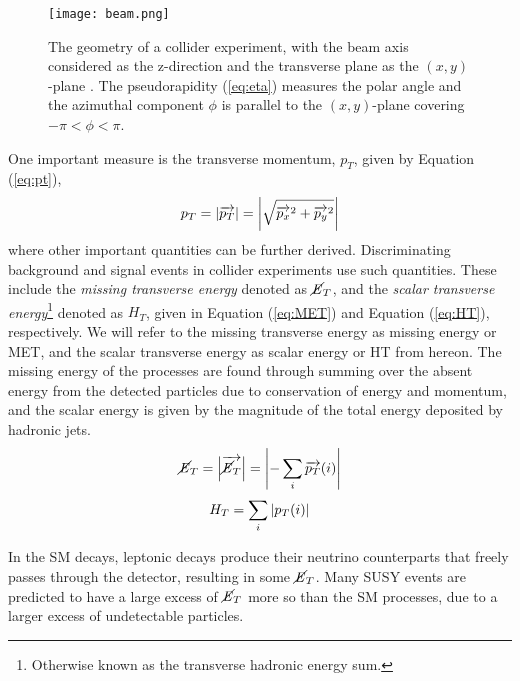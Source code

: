 \begin{figure}[htbp]
    \centering
    \texttt{[image: beam.png]}
    \caption{The geometry of a collider experiment, with the beam axis considered as the z-direction and the transverse plane as the $(x,y)$-plane \cite{barr2011guide}. The pseudorapidity (\ref{eq:eta}) measures the polar angle and the azimuthal component $\phi$ is parallel to the $(x,y)$-plane covering $-\pi < \phi < \pi$. }
    \label{fig:beam}
\end{figure}

One important measure is the transverse momentum, $p_T$, given by Equation (\ref{eq:pt}), 
\begin{equation}
    p_T = \abs{\overrightarrow{p_T}} = \abs{\sqrt{\overrightarrow{p_x}^2 + \overrightarrow{p_y}^2}}
    \label{eq:pt}
\end{equation}
where other important quantities can be further derived. Discriminating background and signal events in collider experiments use such quantities. These include the \textit{missing transverse energy} denoted as $\cancel{\it{E}}_{T}$, and the \textit{scalar transverse energy}\footnote{Otherwise known as the transverse hadronic energy sum.} denoted as $H_T$, given in Equation (\ref{eq:MET}) and Equation (\ref{eq:HT}), respectively. We will refer to the missing transverse energy as missing energy or MET, and the scalar transverse energy as scalar energy or HT from hereon. The missing energy of the processes are found through summing over the absent energy from the detected particles due to conservation of energy and momentum, and the scalar energy is given by the magnitude of the total energy deposited by hadronic jets. \\
\begin{equation}
    \cancel{\it{E}}_{T} = \abs{\overrightarrow{\cancel{\it{E}}_{T}}} = \abs{- \sum_i \overrightarrow{p_T}(i)}
    \label{eq:MET}
\end{equation}
\begin{equation}
    H_T = \sum_i \abs{p_T(i)} 
    \label{eq:HT}
\end{equation}

In the SM decays, leptonic decays produce their neutrino counterparts that freely passes through the detector, resulting in some $\cancel{\it{E}}_{T}$. Many SUSY events are predicted to have a large excess of $\cancel{\it{E}}_{T}$ more so than the SM processes, due to a larger excess of undetectable particles.  \\ 


